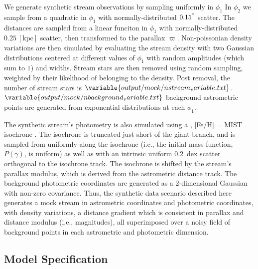 \documentclass[twocolumn]{aastex631}
\newcommand{\unit}[1]{[\text{#1}]}
\newcommand{\parallax}{\varpi}
\begin{document}
        We generate synthetic stream observations by sampling uniformly in
        $\phi_1$ In $\phi_2$ we sample from a quadratic in $\phi_1$ with
        normally-distributed $0.15^{\degree}$ scatter.  The distances are
        sampled from a linear funciton in $\phi_1$ with normally-distributed
        $0.25 \ \unit{kpc}$ scatter, then transformed to the parallax
        $\parallax$.  Non-poissonian density variations are then simulated by
        evaluating the stream density with two Gaussian distributions centered
        at different values of $\phi_1$ with random amplitudes (which sum to
        $1$) and widths.  Stream stars are then removed using random sampling,
        weighted by their likelihood of belonging to the density. Post removal,
        the number of stream stars is
        $\variable{output/mock/nstream_variable.txt}$.
        $\variable{output/mock/nbackground_variable.txt}$ background astrometric
        points are generated from exponential distributions at each $\phi_1$.
    
        The synthetic stream's photometry is also simulated using a
        , [Fe/H] =
         MIST isochrone
        \citep{brutus, Dotter2016, Choi+2016}. The isochrone is truncated just
        short of the giant branch, and is sampled from uniformly along the
        isochrone (i.e., the initial mass function, $P(\gamma)$, is uniform) as
        well as with an intrinsic uniform 0.2~dex scatter orthogonal to the
        isochrone track. The isochrone is shifted by the stream's parallax
        modulus, which is derived from the astrometric distance track.  The
        background photometric coordinates are generated as a 2-dimensional
        Gaussian with non-zero covariance.  Thus, the synthetic data scenario
        described here generates a mock stream in astrometric coordinates and
        photometric coordinates, with density variations, a distance gradient
        which is consistent in parallax and distance modulus (i.e., magnitudes),
        all superimposed over a noisy field of background points in each
        astrometric and photometric dimension.

    \subsection{Model Specification} \label{sub:results_mock:model}
\end{document}

